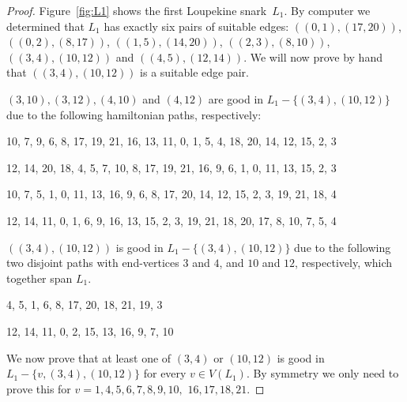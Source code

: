 \documentclass{amcjoucc}
\begin{document}
\begin{proof}


Figure~\ref{fig:L1} shows the first Loupekine snark~$L_1$. By computer we determined that $L_1$ has exactly six pairs of suitable edges: $((0,1),(17,20))$, $((0,2),(8,17))$, $((1,5),(14,20))$, $((2,3),(8,10))$, $((3,4),(10,12))$ and $((4,5),(12,14))$. We will now prove by hand that $((3,4),(10,12))$ is a suitable edge pair.


$(3,10), (3,12), (4,10)$ and $(4,12)$ are good in $L_1 - \{(3,4),(10,12)\}$ due to the following hamiltonian paths, respectively:


\begin{itemize}
{\small
\item 10, 7, 9, 6, 8, 17, 19, 21, 16, 13, 11, 0, 1, 5, 4, 18, 20, 14, 12, 15, 2, 3
\item 12, 14, 20, 18, 4, 5, 7, 10, 8, 17, 19, 21, 16, 9, 6, 1, 0, 11, 13, 15, 2, 3
\item 10, 7, 5, 1, 0, 11, 13, 16, 9, 6, 8, 17, 20, 14, 12, 15, 2, 3, 19, 21, 18, 4
\item 12, 14, 11, 0, 1, 6, 9, 16, 13, 15, 2, 3, 19, 21, 18, 20, 17, 8, 10, 7, 5, 4
}
\end{itemize}

$((3,4),(10,12))$ is good in $L_1 - \{(3,4),(10,12)\}$ due to the following two disjoint paths with end-vertices $3$ and $4$, and $10$ and $12$, respectively, which together span $L_1$.


\begin{itemize}
{\small
\item 4, 5, 1, 6, 8, 17, 20, 18, 21, 19, 3
\item 12, 14, 11, 0, 2, 15, 13, 16, 9, 7, 10}
\end{itemize}

We now prove that at least one of $(3,4)$ or $(10,12)$ is good in $L_1 - \{v,(3,4),(10,12)\}$ for every $v \in V(L_1)$. By symmetry we only need to prove this for $v=1,4,5,6,7,8,9,10,$ $16,17,18,21$.



\end{proof}
\end{document}

